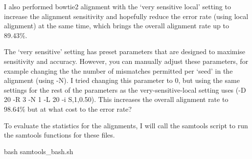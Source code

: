 \documentclass[]{article}
\newenvironment{Shaded}{\begin{snugshade}}{\end{snugshade}}
\newcommand{\FunctionTok}[1]{\textcolor[rgb]{0.00,0.00,0.00}{#1}}
\newcommand{\VariableTok}[1]{\textcolor[rgb]{0.00,0.00,0.00}{#1}}
\newcommand{\OperatorTok}[1]{\textcolor[rgb]{0.81,0.36,0.00}{\textbf{#1}}}
\newcommand{\BuiltInTok}[1]{#1}
\newcommand{\NormalTok}[1]{#1}
\begin{document}
I also performed bowtie2 alignment with the `very sensitive local'
setting to increase the alignment sensitivity and hopefully reduce the
error rate (using local alignment) at the same time, which brings the
overall alignment rate up to 89.43\%.

\begin{Shaded}
\end{Shaded}

The `very sensitive' setting has preset parameters that are designed to
maximise sensitivity and accuracy. However, you can manually adjust
these parameters, for example changing the the number of mismatches
permitted per `seed' in the alignment (using -N). I tried changing this
parameter to 0, but using the same settings for the rest of the
parameters as the very-sensitive-local setting uses (-D 20 -R 3 -N 1 -L
20 -i S,1,0.50). This increases the overall alignment rate to 98.64\%
but at what cost to the error rate?

\begin{Shaded}
\end{Shaded}

To evaluate the statistics for the alignments, I will call the samtools
script to run the samtools functions for these files.

\begin{Shaded}
\begin{Highlighting}[]
\FunctionTok{bash}\NormalTok{ samtools_bash.sh}
\end{Highlighting}
\end{Shaded}
\end{document}
